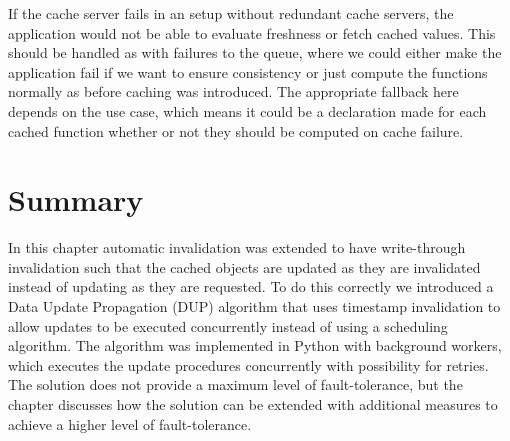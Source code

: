 If the cache server fails in an setup without redundant cache servers, the application would not be able to evaluate freshness or fetch cached values. This should be handled as with failures to the queue, where we could either make the application fail if we want to ensure consistency or just compute the functions normally as before caching was introduced. The appropriate fallback here depends on the use case, which means it could be a declaration made for each cached function whether or not they should be computed on cache failure.


\section{Summary}
\label{sec:summary}

In this chapter automatic invalidation was extended to have write-through invalidation such that the cached objects are updated as they are invalidated instead of updating as they are requested. To do this correctly we introduced a Data Update Propagation (DUP) algorithm that uses timestamp invalidation to allow updates to be executed concurrently instead of using a scheduling algorithm. The algorithm was implemented in Python with background workers, which executes the update procedures concurrently with possibility for retries. The solution does not provide a maximum level of fault-tolerance, but the chapter discusses how the solution can be extended with additional measures to achieve a higher level of fault-tolerance.


